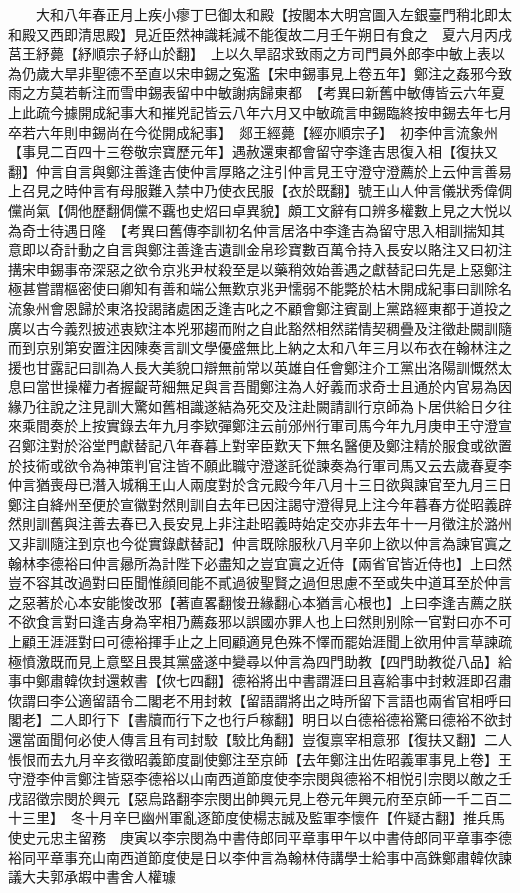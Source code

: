 　　大和八年春正月上疾小瘳丁巳御太和殿【按閣本大明宫圖入左銀臺門稍北即太和殿又西即清思殿】見近臣然神識耗減不能復故二月壬午朔日有食之　夏六月丙戌莒王紓薨【紓順宗子紓山於翻】　上以久旱詔求致雨之方司門員外郎李中敏上表以為仍歲大旱非聖德不至直以宋申錫之寃濫【宋申錫事見上卷五年】鄭注之姦邪今致雨之方莫若斬注而雪申錫表留中中敏謝病歸東都　【考異曰新舊中敏傳皆云六年夏上此疏今據開成紀事大和摧兇記皆云八年六月又中敏疏言申錫臨終按申錫去年七月卒若六年則申錫尚在今從開成紀事】　郯王經薨【經亦順宗子】　初李仲言流象州【事見二百四十三卷敬宗寶歷元年】遇赦還東都會留守李逢吉思復入相【復扶又翻】仲言自言與鄭注善逢吉使仲言厚賂之注引仲言見王守澄守澄薦於上云仲言善易上召見之時仲言有母服難入禁中乃使衣民服【衣於既翻】號王山人仲言儀狀秀偉倜儻尚氣【倜他歷翻倜儻不覊也史炤曰卓異貌】頗工文辭有口辨多權數上見之大悦以為奇士待遇日隆　【考異曰舊傳李訓初名仲言居洛中李逢吉為留守思入相訓揣知其意即以奇計動之自言與鄭注善逢吉遺訓金帛珍寶數百萬令持入長安以賂注又曰初注搆宋申錫事帝深惡之欲令京兆尹杖殺至是以藥稍效始善遇之獻替記曰先是上惡鄭注極甚嘗謂樞密使曰卿知有善和端公無歎京兆尹懦弱不能斃於枯木開成紀事曰訓除名流象州會恩歸於東洛投謁諸處困乏逢吉叱之不顧會鄭注賓副上黨路經東都于道投之廣以古今義烈披述衷欵注本兇邪趨而附之自此豁然相然諾情契稠疊及注徵赴闕訓隨而到京别第安置注因陳奏言訓文學優盛無比上納之太和八年三月以布衣在翰林注之援也甘露記曰訓為人長大美貌口辯無前常以英雄自任會鄭注介工黨出洛陽訓慨然太息曰當世操權力者握齪苛細無足與言吾聞鄭注為人好義而求奇士且通於内官易為因緣乃往說之注見訓大驚如舊相識遂結為死交及注赴闕請訓行京師為卜居供給日夕往來乘間奏於上按實錄去年九月李欵彈鄭注云前邠州行軍司馬今年九月庚申王守澄宣召鄭注對於浴堂門獻替記八年春暮上對宰臣歎天下無名醫便及鄭注精於服食或欲置於技術或欲令為神策判官注皆不願此職守澄遂託從諫奏為行軍司馬又云去歲春夏李仲言猶喪母已潛入城稱王山人兩度對於含元殿今年八月十三日欲與諫官至九月三日鄭注自絳州至便於宣徽對然則訓自去年已因注謁守澄得見上注今年暮春方從昭義辟然則訓舊與注善去春已入長安見上非注赴昭義時始定交亦非去年十一月徵注於潞州又非訓隨注到京也今從實錄獻替記】仲言既除服秋八月辛卯上欲以仲言為諫官寘之翰林李德裕曰仲言曏所為計陛下必盡知之豈宜寘之近侍【兩省官皆近侍也】上曰然豈不容其改過對曰臣聞惟顔囘能不貳過彼聖賢之過但思慮不至或失中道耳至於仲言之惡著於心本安能悛改邪【著直畧翻悛丑緣翻心本猶言心根也】上曰李逢吉薦之朕不欲食言對曰逢吉身為宰相乃薦姦邪以誤國亦罪人也上曰然則别除一官對曰亦不可上顧王涯涯對曰可德裕揮手止之上囘顧適見色殊不懌而罷始涯聞上欲用仲言草諫疏極憤激既而見上意堅且畏其黨盛遂中變尋以仲言為四門助教【四門助教從八品】給事中鄭肅韓佽封還敕書【佽七四翻】德裕將出中書謂涯曰且喜給事中封敕涯即召肅佽謂曰李公適留語令二閣老不用封敕【留語謂將出之時所留下言語也兩省官相呼曰閣老】二人即行下【書牘而行下之也行戶稼翻】明日以白德裕德裕驚曰德裕不欲封還當面聞何必使人傳言且有司封駮【駮比角翻】豈復禀宰相意邪【復扶又翻】二人悵恨而去九月辛亥徵昭義節度副使鄭注至京師【去年鄭注出佐昭義軍事見上卷】王守澄李仲言鄭注皆惡李德裕以山南西道節度使李宗閔與德裕不相悦引宗閔以敵之壬戌詔徵宗閔於興元【惡烏路翻李宗閔出帥興元見上卷元年興元府至京師一千二百二十三里】　冬十月辛巳幽州軍亂逐節度使楊志誠及監軍李懷仵【仵疑古翻】推兵馬使史元忠主留務　庚寅以李宗閔為中書侍郎同平章事甲午以中書侍郎同平章事李德裕同平章事充山南西道節度使是日以李仲言為翰林侍講學士給事中高銖鄭肅韓佽諫議大夫郭承嘏中書舍人權璩